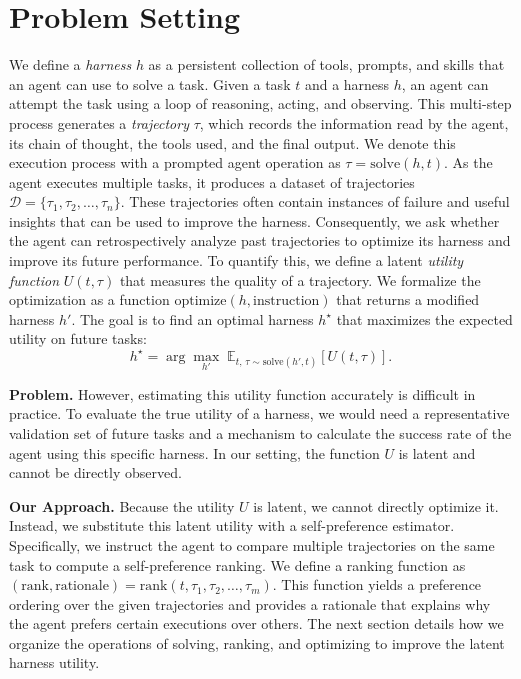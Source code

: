 \section{Problem Setting}
\label{sec:setting}

We define a \textit{harness} $h$ as a persistent collection of tools, prompts, and skills that an agent can use to solve a task.
Given a task $t$ and a harness $h$, an agent can attempt the task using a loop of reasoning, acting, and observing.
This multi-step process generates a \textit{trajectory} $\tau$, which records the information read by the agent, its chain of thought, the tools used, and the final output.
We denote this execution process with a prompted agent operation as $\tau = \mathrm{solve}(h, t)$.
As the agent executes multiple tasks, it produces a dataset of trajectories $\mathcal{D} = \{\tau_1, \tau_2, \ldots, \tau_n\}$.
These trajectories often contain instances of failure and useful insights that can be used to improve the harness.
Consequently, we ask whether the agent can retrospectively analyze past trajectories to optimize its harness and improve its future performance.
To quantify this, we define a latent \textit{utility function} $U(t, \tau)$ that measures the quality of a trajectory.
We formalize the optimization as a function $\mathrm{optimize}(h, \text{instruction})$ that returns a modified harness $h'$.
The goal is to find an optimal harness $h^\star$ that maximizes the expected utility on future tasks:
\vspace{-0.5em}
\[
    h^\star = \arg\max_{h'} \; \mathbb{E}_{t,\, \tau \sim \mathrm{solve}(h', t)}
    \left[ U(t, \tau) \right].
\]

\noindent\textbf{Problem.}
However, estimating this utility function accurately is difficult in practice.
To evaluate the true utility of a harness, we would need a representative validation set of future tasks and a mechanism to calculate the success rate of the agent using this specific harness.
In our setting, the function $U$ is latent and cannot be directly observed.

\noindent\textbf{Our Approach.}
Because the utility $U$ is latent, we cannot directly optimize it.
Instead, we substitute this latent utility with a self-preference estimator.
Specifically, we instruct the agent to compare multiple trajectories on the same task to compute a self-preference ranking.
We define a ranking function as $(\text{rank}, \text{rationale}) = \mathrm{rank}(t, \tau_1, \tau_2, \ldots, \tau_m)$.
This function yields a preference ordering over the given trajectories and provides a rationale that explains why the agent prefers certain executions over others.
The next section details how we organize the operations of solving, ranking, and optimizing to improve the latent harness utility.